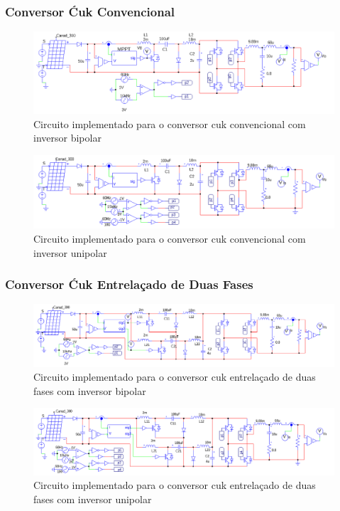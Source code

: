 \documentclass[
	12pt,				%
	openright,			%
	onseside,
	a4paper,			%
	english,			%
	french,				%
	spanish,			%
	brazil,				%
	]{abntex2}
\begin{document}
\subsubsection{Conversor Ćuk Convencional}
\begin{figure}[htb]%
	\captionsetup{justification=centering}
	\centering
		\includegraphics[width=0.7 \linewidth]{comp_conv_circ_clean}
		\caption{Circuito implementado para o conversor cuk convencional com inversor bipolar}
		\label{fig:comp_conv_circ_clean}
\end{figure}
\begin{figure}[htb]%
	\captionsetup{justification=centering}
	\centering
		\includegraphics[width=0.7 \linewidth]{comp_conv_circ_clean_unip}
		\caption{Circuito implementado para o conversor cuk convencional com inversor unipolar}
		\label{fig:comp_conv_circ_clean_unip}
\end{figure}

\subsubsection{Conversor Ćuk Entrelaçado de Duas Fases}
\begin{figure}[H]%
	\captionsetup{justification=centering}
	\centering
		\includegraphics[width=0.7 \linewidth]{comp_interv_circ_clean}
		\caption{Circuito implementado para o conversor cuk entrelaçado de duas fases com inversor bipolar}
		\label{fig:comp_interv_circ_clean}
\end{figure}
\begin{figure}[H]%
	\captionsetup{justification=centering}
	\centering
		\includegraphics[width=0.7 \linewidth]{comp_interv_circ_clean_unip}
		\caption{Circuito implementado para o conversor cuk entrelaçado de duas fases com inversor unipolar}
		\label{fig:comp_interv_circ_clean_unip}
\end{figure}
\end{document}

